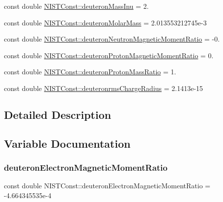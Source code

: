 \begin{DoxyCompactItemize}
\item 
const double \hyperlink{group___n_i_s_t_const-_deuteron_ga65b03219bebd7561b1dae8f084c3d090}{N\+I\+S\+T\+Const\+::deuteron\+Mass\+Inu} = 2.
\item 
const double \hyperlink{group___n_i_s_t_const-_deuteron_ga19086965236aae3504b4c0efb1cfaf41}{N\+I\+S\+T\+Const\+::deuteron\+Molar\+Mass} = 2.\+013553212745e-\/3
\item 
const double \hyperlink{group___n_i_s_t_const-_deuteron_gaad8a0231ec17f5669c9c22a4daba5a77}{N\+I\+S\+T\+Const\+::deuteron\+Neutron\+Magnetic\+Moment\+Ratio} = -\/0.
\item 
const double \hyperlink{group___n_i_s_t_const-_deuteron_gaac523a6a3c61390396544e4b0acb3c05}{N\+I\+S\+T\+Const\+::deuteron\+Proton\+Magnetic\+Moment\+Ratio} = 0.
\item 
const double \hyperlink{group___n_i_s_t_const-_deuteron_gabe2731d4997c2227da2cc2d7e7cda194}{N\+I\+S\+T\+Const\+::deuteron\+Proton\+Mass\+Ratio} = 1.
\item 
const double \hyperlink{group___n_i_s_t_const-_deuteron_gaef4ebab0e996f7ac1934663efbd32aed}{N\+I\+S\+T\+Const\+::deuteronrms\+Charge\+Radius} = 2.\+1413e-\/15
\end{DoxyCompactItemize}


\subsection{Detailed Description}


\subsection{Variable Documentation}
\mbox{\label{group___n_i_s_t_const-_deuteron_gaa01fffefa3ab64430fabf08808572689}} 
\subsubsection{\texorpdfstring{deuteron\+Electron\+Magnetic\+Moment\+Ratio}{deuteronElectronMagneticMomentRatio}}
{\footnotesize\ttfamily const double N\+I\+S\+T\+Const\+::deuteron\+Electron\+Magnetic\+Moment\+Ratio = -\/4.\+664345535e-\/4}

